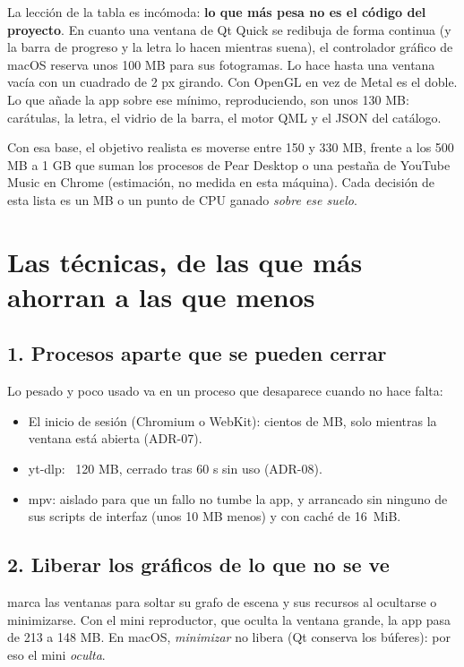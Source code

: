 La lección de la tabla es incómoda: \textbf{lo que más pesa no es el código del proyecto}. En
cuanto una ventana de Qt Quick se redibuja de forma continua (y la barra de progreso y la
letra lo hacen mientras suena), el controlador gráfico de macOS reserva unos 100 MB para sus
fotogramas. Lo hace hasta una ventana vacía con un cuadrado de 2 px girando. Con OpenGL en vez
de Metal es el doble. Lo que añade la app sobre ese mínimo, reproduciendo, son unos 130 MB:
carátulas, la letra, el vidrio de la barra, el motor QML y el JSON del catálogo.

\begin{idea}
Con esa base, el objetivo realista es moverse entre 150 y 330 MB, frente a los 500 MB a 1 GB
que suman los procesos de Pear Desktop o una pestaña de YouTube Music en Chrome (estimación,
no medida en esta máquina). Cada decisión de esta lista es un MB o un punto de CPU ganado
\emph{sobre ese suelo}.
\end{idea}

\section{Las técnicas, de las que más ahorran a las que menos}

\subsection{1. Procesos aparte que se pueden cerrar}

Lo pesado y poco usado va en un proceso que desaparece cuando no hace falta:

\begin{itemize}
  \item El inicio de sesión (Chromium o WebKit): cientos de MB, solo mientras la ventana está
  abierta (ADR-07).
  \item yt-dlp: ~120 MB, cerrado tras 60 s sin uso (ADR-08).
  \item mpv: aislado para que un fallo no tumbe la app, y arrancado sin ninguno de sus
  scripts de interfaz (unos 10 MB menos) y con caché de 16~MiB.
\end{itemize}

\subsection{2. Liberar los gráficos de lo que no se ve}

 marca las ventanas para soltar su grafo de escena y sus recursos al
ocultarse o minimizarse. Con el mini reproductor, que oculta la ventana grande, la app pasa de
213 a 148 MB. En macOS, \emph{minimizar} no libera (Qt conserva los búferes): por eso el mini
\emph{oculta}.

